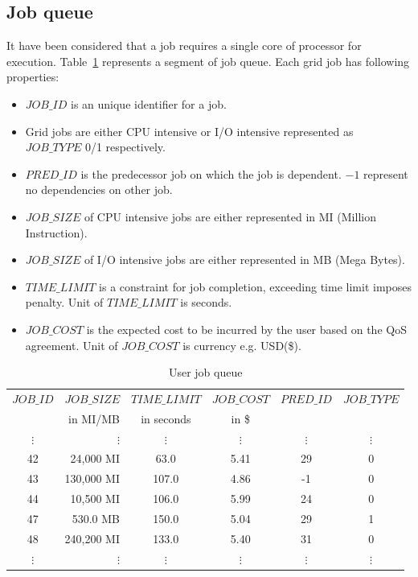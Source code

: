 \subsection{Job queue}
It have been considered that a job requires a single core of processor for execution. Table~\ref{jobmodel} represents a segment of job queue.
Each grid job has following properties:
\begin{itemize}
 \item $JOB\_ID$ is an unique identifier for a job.
 \item Grid jobs are either CPU intensive or I/O intensive represented as $JOB\_TYPE$ 0/1 respectively.
 \item $PRED\_ID$ is the predecessor job on which the job is dependent. $-1$ represent no dependencies on other job.
 \item $JOB\_SIZE$ of CPU intensive jobs are either represented in MI (Million Instruction). %
 \item $JOB\_SIZE$ of I/O intensive jobs are either represented in MB (Mega Bytes). %
 \item $TIME\_LIMIT$ is a constraint for job completion, exceeding time limit imposes penalty. Unit of $TIME\_LIMIT$ is seconds.
 \item $JOB\_COST$ is the expected cost to be incurred by the user based on the QoS agreement. Unit of $JOB\_COST$ is currency e.g. USD(\$).
\end{itemize}
\begin{table}[ht]
\caption{User job queue}
    \begin{tabular}{|c|r|c|c|c|c|}
    \hline \hline
    $JOB\_ID$ & $JOB\_SIZE$ & $TIME\_LIMIT$ & $JOB\_COST$ & $PRED\_ID$ & $JOB\_TYPE$ \\ 
     & in MI/MB & in seconds & in \$ &  &  \\ \hline
    $\vdots$ & $\vdots$ & $\vdots$   & $\vdots$ & $\vdots$	     & $\vdots$  \\
    42     & 24,000 MI  & 63.0  & 5.41 & 29                 & 0        \\
    43     & 130,000 MI  & 107.0 & 4.86 & -1                 & 0        \\
    44     & 10,500 MI  & 106.0 & 5.99 & 24                 & 0        \\ 
    47     & 530.0 MB  & 150.0 & 5.04 & 29   	       & 1	\\
    48     & 240,200 MI  & 133.0 & 5.40 & 31   	       & 0        \\
    $\vdots$ & $\vdots$ & $\vdots$   & $\vdots$ & $\vdots$	     & $\vdots$  \\ \hline
    \end{tabular}
\label{jobmodel}
\end{table}
